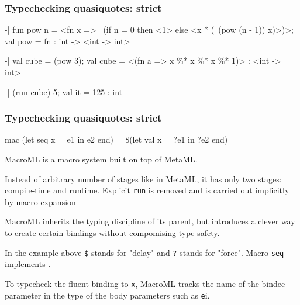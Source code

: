 \documentclass[hyperref={bookmarks=false}]{beamer}
\begin{document}
\begin{frame}[fragile]
\frametitle{Typechecking quasiquotes: strict}

\begin{lstlistinglike}
\begin{semiverbatim}
-| fun pow n = <fn x =>
    ~(if n = 0 then <1> else <x * (~(pow (n - 1)) x)>)>;
val pow = fn : int -> <int -> int>

-| val cube = (pow 3);
val cube = <(fn a => x \%* x \%* x \%* 1)> : <int -> int>

-| (run cube) 5;
val it = 125 : int
\end{semiverbatim}
\end{lstlistinglike}


\end{frame}

\begin{frame}[fragile]
\frametitle{Typechecking quasiquotes: strict}

\begin{lstlistinglike}
\begin{semiverbatim}
mac (let seq x = e1 in e2 end) =
   \$(let val x = ?e1 in ?e2 end)
\end{semiverbatim}
\end{lstlistinglike}

MacroML is a macro system built on top of MetaML.

Instead of arbitrary number of stages like in MetaML,
it has only two stages: compile-time and runtime.
Explicit \texttt{run} is removed and is carried out implicitly
by macro expansion

MacroML inherits the typing discipline of its parent,
but introduces a clever way to create certain bindings without compomising type safety.

In the example above \texttt{\$} stands for "delay" and \texttt{?} stands for "force". Macro \texttt{seq}
implements \text{\color{red}{(wtf does it implement?)}}.

To typecheck the fluent binding to \texttt{x}, MacroML tracks the name of the bindee parameter in the type
of the body parameters such as \texttt{e}i.
\end{frame}
\end{document}
